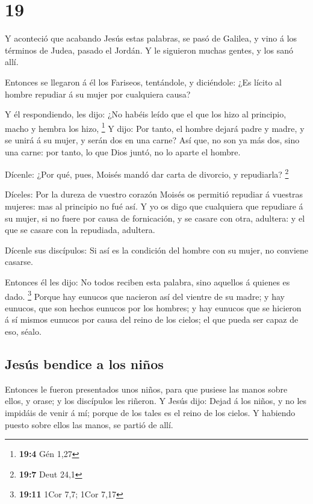 \hypertarget{section-18}{%
\section{19}\label{section-18}}

 Y aconteció que acabando Jesús estas palabras, se pasó de
Galilea, y vino á los términos de Judea, pasado el Jordán. 
Y le siguieron muchas gentes, y los sanó allí.

 Entonces se llegaron á él los Fariseos, tentándole, y
diciéndole: ¿Es lícito al hombre repudiar á su mujer por cualquiera
causa?

 Y él respondiendo, les dijo: ¿No habéis leído que el que
los hizo al principio, macho y hembra los hizo, \footnote{\textbf{19:4}
  Gén 1,27}  Y dijo: Por tanto, el hombre dejará padre y
madre, y se unirá á su mujer, y serán dos en una carne?  Así
que, no son ya más dos, sino una carne: por tanto, lo que Dios juntó, no
lo aparte el hombre.

 Dícenle: ¿Por qué, pues, Moisés mandó dar carta de
divorcio, y repudiarla? \footnote{\textbf{19:7} Deut 24,1}

 Díceles: Por la dureza de vuestro corazón Moisés os
permitió repudiar á vuestras mujeres: mas al principio no fué así.
 Y yo os digo que cualquiera que repudiare á su mujer, si no
fuere por causa de fornicación, y se casare con otra, adultera: y el que
se casare con la repudiada, adultera.

 Dícenle sus discípulos: Si así es la condición del hombre
con su mujer, no conviene casarse.

 Entonces él les dijo: No todos reciben esta palabra, sino
aquellos á quienes es dado. \footnote{\textbf{19:11} 1Cor 7,7; 1Cor 7,17}
 Porque hay eunucos que nacieron así del vientre de su
madre; y hay eunucos, que son hechos eunucos por los hombres; y hay
eunucos que se hicieron á sí mismos eunucos por causa del reino de los
cielos; el que pueda ser capaz de eso, séalo.

\hypertarget{jesuxfas-bendice-a-los-niuxf1os}{%
\subsection{Jesús bendice a los
niños}\label{jesuxfas-bendice-a-los-niuxf1os}}

 Entonces le fueron presentados unos niños, para que
pusiese las manos sobre ellos, y orase; y los discípulos les riñeron.
 Y Jesús dijo: Dejad á los niños, y no les impidáis de
venir á mí; porque de los tales es el reino de los cielos. 
Y habiendo puesto sobre ellos las manos, se partió de allí.

